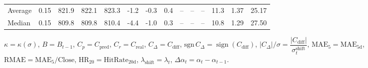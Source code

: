 \begin{threeparttable}
{\begin{tabular}{lrrrrrrrrrrrrr}
Average &     0.15 & 821.9 & 822.1 & 823.3 &       -1.2 &                     -0.3 &                 0.4 &         -- &        -- &             -- &             11.3 &            1.37 &                  25.17 \\
 Median &     0.15 & 809.8 & 809.8 & 810.4 &       -4.4 &                     -1.0 &                 0.3 &         -- &        -- &             -- &             10.8 &            1.29 &                  27.50 \\
\bottomrule
\end{tabular}
}
\begin{tablenotes}\footnotesize
\item $\kappa=\kappa(\sigma)$, $B=B_{t-1}$, $C_p=C_{\text{pred}}$, $C_r=C_{\text{real}}$, $C_\Delta=C_{\text{diff}}$, $\mathrm{sgn}\,C_\Delta=\operatorname{sign}(C_{\text{diff}})$, $|C_\Delta|/\sigma=\dfrac{|C_{\text{diff}}|}{\sigma_t^{\text{shift}}}$, $\mathrm{MAE}_5=\mathrm{MAE}_{5\text{d}}$, $\mathrm{RMAE}= \mathrm{MAE}_5 / \text{Close}$, $\mathrm{HR}_{20}=\mathrm{HitRate}_{20\text{d}}$, 
$\lambda_{\text{shift}}=\lambda_t$, 
$\Delta\alpha_t=\alpha_t-\alpha_{t-1}$.
\end{tablenotes}
\end{threeparttable}
\endgroup

